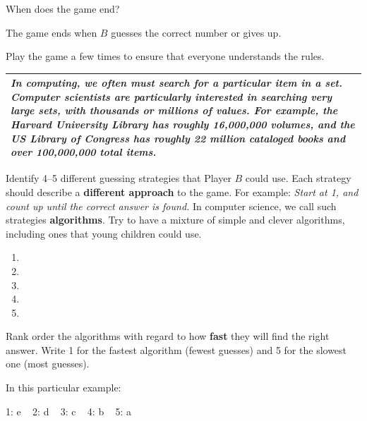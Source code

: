 \Q When does the game end?

\begin{answer}[2em]
The game ends when $B$ guesses the correct number or gives up.
\end{answer}


\Q Play the game a few times to ensure that everyone understands the rules.

\vspace{1ex}


\begin{center}
\begin{tabularx}{\linewidth}{|X|}
\hline
\it
In computing, we often must search for a particular item in a set.
Computer scientists are particularly interested in searching very large sets, with thousands or millions of values.
For example, the Harvard University Library has roughly 16,000,000 volumes, and the US Library of Congress has roughly 22 million cataloged books and over 100,000,000 total items.
\\
\hline
\end{tabularx}
\end{center}


\Q Identify 4--5 different guessing strategies that Player $B$ could use.
Each strategy should describe a \textbf{different approach} to the game.
For example: \textit{Start at 1, and count up until the correct answer is found.}
In computer science, we call such strategies \textbf{algorithms}.
Try to have a mixture of simple and clever algorithms, including ones that young children could use.

\begin{enumerate}
\item {}
\item {}
\item {}
\item {}
\item {}
\end{enumerate}


\Q Rank order the algorithms with regard to how \textbf{fast} they will find the right answer.
Write 1 for the fastest algorithm (fewest guesses) and 5 for the slowest one (most guesses).

\begin{answer}
In this particular example:

1: e ~ 2: d ~ 3: c ~ 4: b ~ 5: a
\end{answer}


